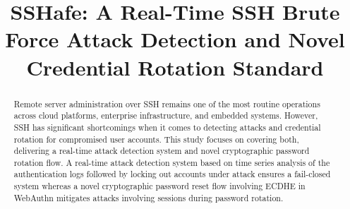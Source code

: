 \documentclass[conference]{IEEEtran}
\begin{document}
\title{SSHafe: A Real-Time SSH Brute Force Attack Detection and Novel Credential Rotation Standard}

\author{
\and
{}
\and
{}
\and
{}
\and
{}
\and
{}
}
\maketitle

\begin{abstract}
Remote server administration over SSH remains one of the most routine operations across cloud platforms, enterprise infrastructure, and embedded systems. However, SSH has significant shortcomings when it comes to detecting attacks and credential rotation for compromised user accounts. This study focuses on covering both, delivering a real-time attack detection system and novel cryptographic password rotation flow. A real-time attack detection system based on time series analysis of the authentication logs followed by locking out accounts under attack ensures a fail-closed system whereas a novel cryptographic password reset flow involving ECDHE in WebAuthn mitigates attacks involving sessions during password rotation.

\end{abstract}
\end{document}

